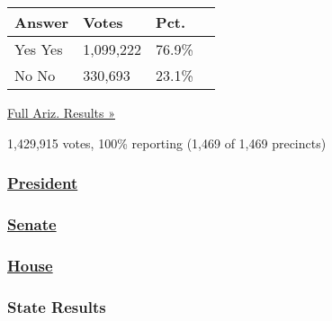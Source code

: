 \begin{longtable}[]{@{}llll@{}}
\toprule
Answer & Votes & Pct. &\tabularnewline
\midrule
\endhead
 Yes Yes & 1,099,222 & 76.9\% &\tabularnewline
 No No & 330,693 & 23.1\% &\tabularnewline
\bottomrule
\end{longtable}

\href{https://www.nytimes.com/elections/2016/results/arizona}{Full Ariz.
Results »}

1,429,915 votes, 100\% reporting (1,469 of 1,469 precincts)

\hypertarget{president-1}{%
\subsubsection{\texorpdfstring{\href{//www.nytimes.com/elections/2016/results/president}{President}}{President}}\label{president-1}}

\hypertarget{senate}{%
\subsubsection{\texorpdfstring{\href{//www.nytimes.com/elections/2016/results/senate}{Senate}}{Senate}}\label{senate}}

\hypertarget{house}{%
\subsubsection{\texorpdfstring{\href{//www.nytimes.com/elections/2016/results/house}{House}}{House}}\label{house}}

\hypertarget{state-results}{%
\subsubsection{State Results}\label{state-results}}

